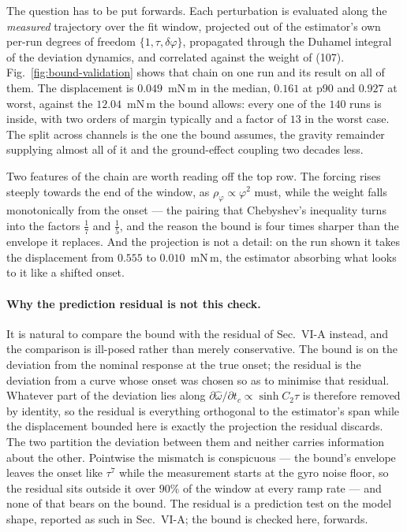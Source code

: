 \documentclass[10pt]{article}
\begin{document}
The question has to be put forwards. Each perturbation is evaluated
along the \emph{measured} trajectory over the fit window, projected out
of the estimator's own per-run degrees of freedom $\{1,\tau,
\delta\varphi\}$, propagated through the Duhamel integral of the
deviation dynamics, and correlated against the weight of
(107). Fig.~\ref{fig:bound-validation} shows that chain on
one run and its result on all of them. The displacement is $0.049$~mN\,m
in the median, $0.161$ at p90 and $0.927$ at worst, against the
$12.04$~mN\,m the bound allows: every one of the $140$ runs is inside,
with two orders of margin typically and a factor of $13$ in the worst
case. The split across channels is the one the bound assumes, the
gravity remainder supplying almost all of it and the ground-effect
coupling two decades less.

Two features of the chain are worth reading off the top row. The
forcing rises steeply towards the end of the window, as
$\rho_\varphi\propto\varphi^2$ must, while the weight falls
monotonically from the onset --- the pairing that Chebyshev's inequality
turns into the factors $\tfrac17$ and $\tfrac15$, and the reason the
bound is four times sharper than the envelope it replaces. And the
projection is not a detail: on the run shown it takes the displacement
from $0.555$ to $0.010$~mN\,m, the estimator absorbing what looks to it
like a shifted onset.

\paragraph{Why the prediction residual is not this check.}
It is natural to compare the bound with the residual of
Sec.~VI-A instead, and the comparison is ill-posed rather
than merely conservative. The bound is on the deviation from the
nominal response at the true onset; the residual is the deviation from
a curve whose onset was chosen so as to minimise that residual.
Whatever part of the deviation lies along $\partial\hat\omega/\partial
t_c\propto\sinh C_2\tau$ is therefore removed by identity, so the
residual is everything orthogonal to the estimator's span while the
displacement bounded here is exactly the projection the residual
discards. The two partition the deviation between them and neither
carries information about the other. Pointwise the mismatch is
conspicuous --- the bound's envelope leaves the onset like $\tau^7$
while the measurement starts at the gyro noise floor, so the residual
sits outside it over $90\%$ of the window at every ramp rate --- and
none of that bears on the bound. The residual is a prediction test on
the model shape, reported as such in Sec.~VI-A; the
bound is checked here, forwards.
\end{document}
